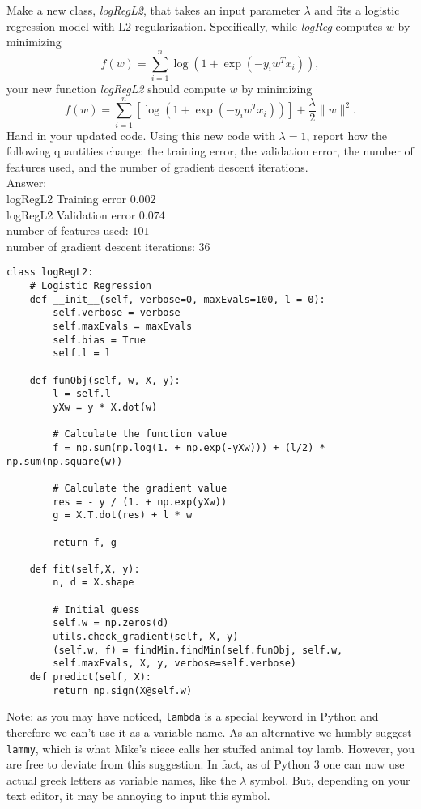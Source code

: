 \documentclass{article}
\def\blu#1{{\color{blu}#1}}
\def\gre#1{{\color{gre}#1}}
\def\norm#1{\|#1\|}
\def\ans#1{\gre{Answer: #1}}{}
\begin{document}
Make a new class, \emph{logRegL2}, that takes an input parameter $\lambda$ and fits a logistic regression model with L2-regularization. Specifically, while \emph{logReg} computes $w$ by minimizing
\[
f(w) = \sum_{i=1}^n \log(1+\exp(-y_iw^Tx_i)),
\]
your new function \emph{logRegL2} should compute $w$ by minimizing
\[
f(w) = \sum_{i=1}^n \left[\log(1+\exp(-y_iw^Tx_i))\right] + \frac{\lambda}{2}\norm{w}^2.
\]
\blu{Hand in your updated code. Using this new code with $\lambda = 1$, report how the following quantities change: the training error, the validation error, the number of features used, and the number of gradient descent iterations.}
\\
\ans{
\\logRegL2 Training error $0.002$
\\logRegL2 Validation error $0.074$
\\number of features used: $101$
\\number of gradient descent iterations: $36$
}
\begin{lstlisting}[style=base]
class logRegL2:
	# Logistic Regression
	def __init__(self, verbose=0, maxEvals=100, l = 0):
		self.verbose = verbose
		self.maxEvals = maxEvals
		self.bias = True
		self.l = l
	
	def funObj(self, w, X, y):
		l = self.l
		yXw = y * X.dot(w)
	
		# Calculate the function value
		f = np.sum(np.log(1. + np.exp(-yXw))) + (l/2) * np.sum(np.square(w))
		
		# Calculate the gradient value
		res = - y / (1. + np.exp(yXw))
		g = X.T.dot(res) + l * w
		
		return f, g
		
	def fit(self,X, y):
		n, d = X.shape
		
		# Initial guess
		self.w = np.zeros(d)
		utils.check_gradient(self, X, y)
		(self.w, f) = findMin.findMin(self.funObj, self.w,
		self.maxEvals, X, y, verbose=self.verbose)
	def predict(self, X):
		return np.sign(X@self.w)

\end{lstlisting}
Note: as you may have noticed, \texttt{lambda} is a special keyword in Python and therefore we can't use it as a variable name.
As an alternative we humbly suggest \texttt{lammy}, which is what Mike's niece calls her stuffed animal toy lamb.
However, you are free to deviate from this suggestion. In fact, as of Python 3 one can now use actual greek letters as variable names, like the $\lambda$ symbol. But, depending on your text editor, it may be annoying to input this symbol.
\end{document}
